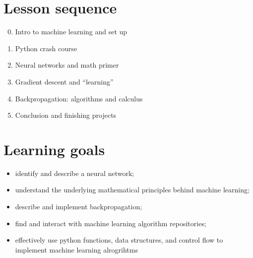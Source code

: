 \documentclass[11pt]{article}
\begin{document}
\vfill
\section*{Lesson sequence}

\begin{enumerate}
    \setcounter{enumi}{-1}
  \item Intro to machine learning and set up
  \item Python crash course
  \item Neural networks and math primer
  \item Gradient descent and ``learning''
  \item Backpropagation: algorithms and calculus
  \item Conclusion and finishing projects
\end{enumerate}

\section*{Learning goals}

\begin{itemize}
  \item identify and describe a neural network;
  \item understand the underlying mathematical principles behind machine learning;
  \item describe and implement backpropagation;
  \item find and interact with machine learning algorithm repositories;
  \item effectively use python functions, data structures, and control flow to
    implement machine learning alrogrihtms
\end{itemize}
\end{document}
